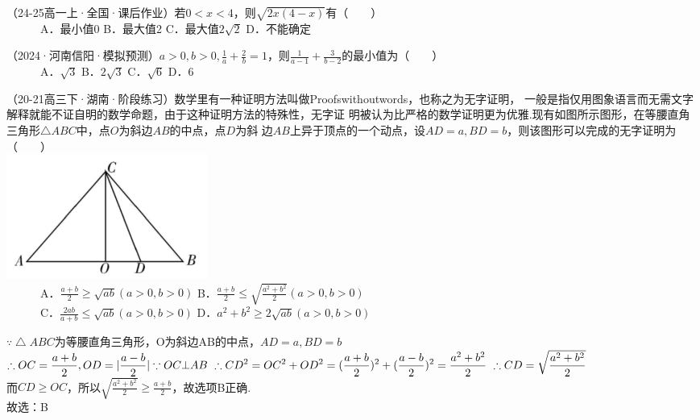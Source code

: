 \begin{hmwk}
    （24-25高一上·全国·课后作业）若$0<x<4$，则$\sqrt{2x(4-x)}$有（    ）\\
          A．最小值0 \quad\quad	B．最大值2 \quad\quad	C．最大值$2\sqrt{2}$ \quad\quad	D．不能确定
\end{hmwk}

\begin{hmwk}
    （2024·河南信阳·模拟预测）$\displaystyle a>0,b>0,\frac{1}{a}+\frac{2}{b}=1$，则$\displaystyle \frac{1}{a-1}+\frac{3}{b-2}$的最小值为（    ）\\
          A．$\sqrt{3}$ \quad\quad	B．$2\sqrt{3}$ \quad\quad	C．$\sqrt{6}$ \quad\quad	D．6
\end{hmwk}

\begin{hmwk}
    （20-21高三下·湖南·阶段练习）数学里有一种证明方法叫做Proofswithoutwords，也称之为无字证明，
    一般是指仅用图象语言而无需文字解释就能不证自明的数学命题，由于这种证明方法的特殊性，无字证
    明被认为比严格的数学证明更为优雅.现有如图所示图形，在等腰直角三角形$\bigtriangleup ABC$中，点$O$为斜边$AB$的中点，点$D$为斜
    边$AB$上异于顶点的一个动点，设$AD=a,BD=b$，则该图形可以完成的无字证明为（    ）\\
    \includegraphics[scale=1.0]{pictures/image3.png}\\
          A．$\displaystyle \frac{a+b}{2}\ge \sqrt{ab}(a>0,b>0)$ \quad\quad	B．$\displaystyle \frac{a+b}{2}\le \sqrt{\frac{a^2+b^2}{2}}(a>0,b>0)$ \quad\quad\\	
          C．$\displaystyle \frac{2ab}{a+b}\le \sqrt{ab}(a>0,b>0)$ \quad\quad	D．$\displaystyle a^2+b^2\ge 2\sqrt{ab}(a>0,b>0)$
    \begin{jiexi}
        $\because \bigtriangleup ABC$为等腰直角三角形，O为斜边AB的中点，$AD=a,BD=b$\\
        $\displaystyle\therefore OC=\frac{a+b}{2},OD=|\frac{a-b}{2}|\\
        \because OC\bot AB \ \therefore CD^2=OC^2+OD^2=(\frac{a+b}{2})^2+(\frac{a-b}{2})^2=\frac{a^2+b^2}{2}\ \therefore CD=\sqrt{\frac{a^2+b^2}{2}}$\\
        而$CD\ge OC$，所以$\displaystyle \sqrt{\frac{a^2+b^2}{2}}\ge\frac{a+b}{2}$，故选项B正确.\\
        故选：B
    \end{jiexi}
\end{hmwk}
